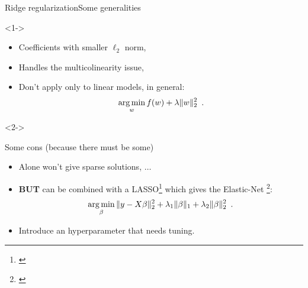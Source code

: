 \documentclass[10pt,aspectratio=43]{beamer}
\begin{document}
\begin{frame}{Ridge regularization}{Some generalities}
    \begin{onlyenv}<1->
    \begin{itemize}
        \item<1-> Coefficients with smaller $\ell_2$ norm,
        \item<1-> Handles the multicolinearity issue,
        \item<1-> Don't apply only to linear models, in general:
        \[\mathop{\mathrm{arg\,min}}_w f(w) + \lambda \|w\|^2_2 \enspace.\]
    \end{itemize}
\end{onlyenv}
\begin{onlyenv}<2->
        \begin{block}{Some cons (because there must be some)}
            \begin{itemize}
        \item<2-> Alone won't give sparse solutions, $\dots$
        \item<2-> \textbf{BUT} can be combined with a LASSO\footnote[frame]{\citet{Tibshirani96}} which gives the Elastic-Net \footnote[frame]{\citet{Zou_Hastie05}}:
        \[\mathop{\mathrm{arg\,min}}_\beta \|y-X\beta\|_2^2 + \lambda_1 \|\beta\|_1 + \lambda_2 \|\beta\|_2^2\enspace.\]
        \item<2-> Introduce an hyperparameter that needs tuning.
            \end{itemize}
        \end{block}
    \end{onlyenv}

\end{frame}

\end{document}
